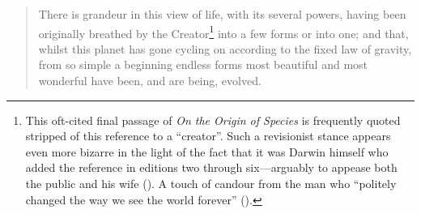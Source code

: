 \documentclass{tufte-book}
\begin{document}





\begin{quotation}
  There is grandeur in this view of life, with its several powers, having been
  originally breathed by the Creator\footnote{This \mbox{oft-cited} final
    passage of \emph{On the Origin of Species} is frequently quoted stripped of
    this reference to a ``creator''.  Such a revisionist stance appears even
    more bizarre in the light of the fact that it was Darwin himself who added
    the reference in editions two through six---arguably to appease both the
    public and his wife (\citealp{thompson_origin_2003}).  A touch of candour
    from the man who ``politely changed the way we see the world forever''
    (\citealp{rutherford_there_2008}).} into a few forms or into one; and that,
  whilst this planet has gone cycling on according to the fixed law of gravity,
  from so simple a beginning endless forms most beautiful and most wonderful
  have been, and are being, evolved.
\end{quotation}
\end{document}

